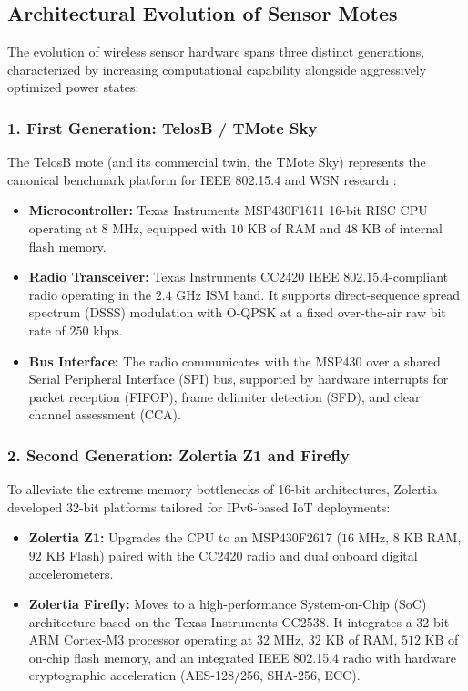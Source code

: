 \subsection{Architectural Evolution of Sensor Motes}
The evolution of wireless sensor hardware spans three distinct generations, characterized by increasing computational capability alongside aggressively optimized power states:

\subsubsection{1. First Generation: TelosB / TMote Sky}
The TelosB mote (and its commercial twin, the TMote Sky) represents the canonical benchmark platform for IEEE 802.15.4 and WSN research \cite{dunkels2004contiki}:
\begin{itemize}
    \item \textbf{Microcontroller:} Texas Instruments MSP430F1611 16-bit RISC CPU operating at $8\text{~MHz}$, equipped with $10\text{~KB}$ of RAM and $48\text{~KB}$ of internal flash memory.
    \item \textbf{Radio Transceiver:} Texas Instruments CC2420 IEEE 802.15.4-compliant radio operating in the $2.4\text{~GHz}$ ISM band. It supports direct-sequence spread spectrum (DSSS) modulation with O-QPSK at a fixed over-the-air raw bit rate of $250\text{~kbps}$.
    \item \textbf{Bus Interface:} The radio communicates with the MSP430 over a shared Serial Peripheral Interface (SPI) bus, supported by hardware interrupts for packet reception (FIFOP), frame delimiter detection (SFD), and clear channel assessment (CCA).
\end{itemize}

\subsubsection{2. Second Generation: Zolertia Z1 and Firefly}
To alleviate the extreme memory bottlenecks of 16-bit architectures, Zolertia developed 32-bit platforms tailored for IPv6-based IoT deployments:
\begin{itemize}
    \item \textbf{Zolertia Z1:} Upgrades the CPU to an MSP430F2617 ($16\text{~MHz}$, $8\text{~KB}$ RAM, $92\text{~KB}$ Flash) paired with the CC2420 radio and dual onboard digital accelerometers.
    \item \textbf{Zolertia Firefly:} Moves to a high-performance System-on-Chip (SoC) architecture based on the Texas Instruments CC2538. It integrates a 32-bit ARM Cortex-M3 processor operating at $32\text{~MHz}$, $32\text{~KB}$ of RAM, $512\text{~KB}$ of on-chip flash memory, and an integrated IEEE 802.15.4 radio with hardware cryptographic acceleration (AES-128/256, SHA-256, ECC).
\end{itemize}


